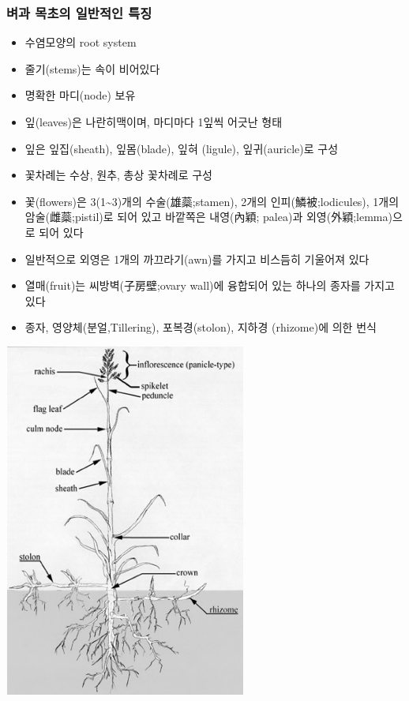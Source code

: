 \documentclass[]{book}
\providecommand{\tightlist}{%
  \setlength{\itemsep}{0pt}\setlength{\parskip}{0pt}}
\begin{document}
\subsubsection{벼과 목초의 일반적인 특징}\label{---}

\begin{itemize}
\tightlist
\item
  수염모양의 root system
\item
  줄기(stems)는 속이 비어있다
\item
  명확한 마디(node) 보유
\item
  잎(leaves)은 나란히맥이며, 마디마다 1잎씩 어긋난 형태
\item
  잎은 잎집(sheath), 잎몸(blade), 잎혀 (ligule), 잎귀(auricle)로 구성
\item
  꽃차례는 수상, 원추, 총상 꽃차례로 구성
\item
  꽃(flowers)은 3(1\textasciitilde{}3)개의 수술(雄蘂;stamen), 2개의
  인피(鱗被;lodicules), 1개의 암술(雌蘂;pistil)로 되어 있고 바깥쪽은
  내영(內穎; palea)과 외영(外穎;lemma)으로 되어 있다
\item
  일반적으로 외영은 1개의 까끄라기(awn)를 가지고 비스듬히 기울어져 있다
\item
  열매(fruit)는 씨방벽(子房壁;ovary wall)에 융합되어 있는 하나의 종자를
  가지고 있다
\item
  종자, 영양체(분얼,Tillering), 포복경(stolon), 지하경 (rhizome)에 의한
  번식
\end{itemize}

\includegraphics[width=300]{figures/grass2}
\end{document}
